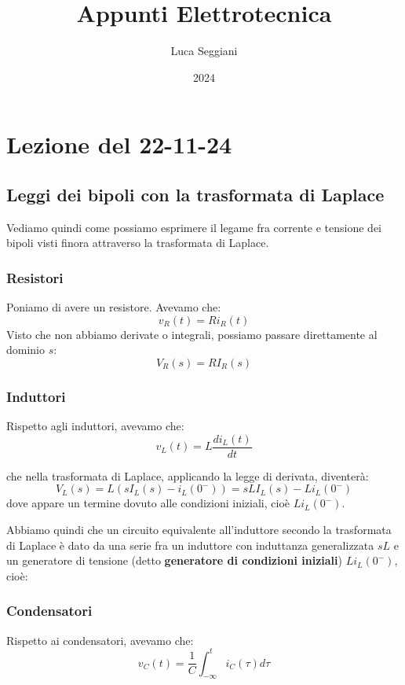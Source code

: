 \documentclass[a4paper,11pt]{article}
\title{Appunti Elettrotecnica}
\author{Luca Seggiani}
\date{2024}
\begin{document}
\section{Lezione del 22-11-24}

\thispagestyle{empty}
\pagestyle{fancy}

\subsection{Leggi dei bipoli con la trasformata di Laplace}
Vediamo quindi come possiamo esprimere il legame fra corrente e tensione dei bipoli visti finora attraverso la trasformata di Laplace.
\subsubsection{Resistori}
Poniamo di avere un resistore. Avevamo che:
$$
v_R(t) = R i_R(t)
$$
Visto che non abbiamo derivate o integrali, possiamo passare direttamente al dominio $s$:
$$
V_R(s) = R I_R(s)
$$

\subsubsection{Induttori}
Rispetto agli induttori, avevamo che:
$$
v_L(t) = L\frac{di_L(t)}{dt}
$$

che nella trasformata di Laplace, applicando la legge di derivata, diventerà:
$$
V_L(s) = L \left( s I_L(s) - i_L(0^-) \right) = s L I_L(s) - L i_L (0^-)
$$
dove appare un termine dovuto alle condizioni iniziali, cioè $L i_L (0^-)$. 

Abbiamo quindi che un circuito equivalente all'induttore secondo la trasformata di Laplace è dato da una serie fra un induttore con induttanza generalizzata $sL$ e un generatore di tensione (detto \textbf{generatore di condizioni iniziali}) $L i_L(0^-)$, cioè:

\begin{center}
\end{center}

\subsubsection{Condensatori}
Rispetto ai condensatori, avevamo che:
$$
v_C(t) = \frac{1}{C} \int_{-\infty}^t i_C(\tau) d\tau
$$
\end{document}
